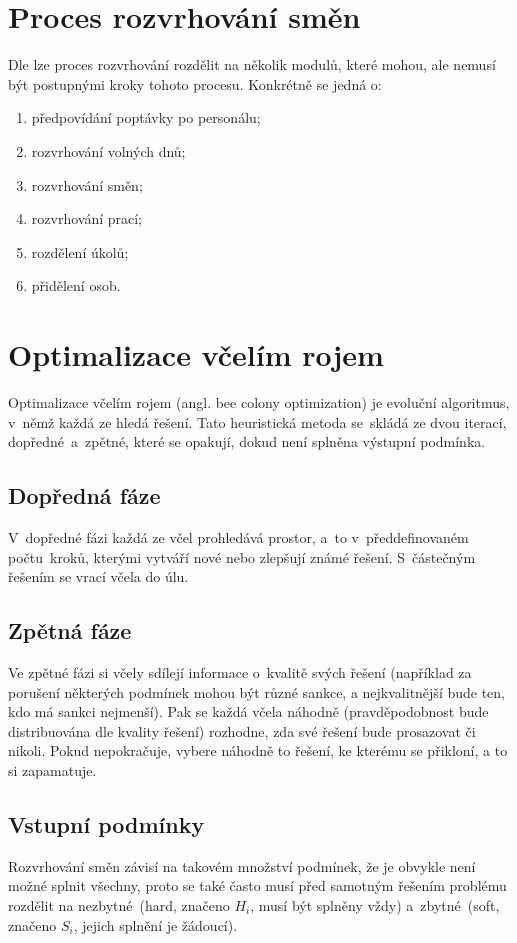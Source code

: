 \documentclass[twoside]{ctuthesis}
\begin{document}
\section{Proces rozvrhování směn}
Dle \cite{ernst2004staff} lze proces rozvrhování rozdělit na několik modulů, které mohou, ale nemusí být postupnými kroky tohoto procesu. Konkrétně se jedná o:
\begin{enumerate}
	\item předpovídání poptávky po personálu;
	\item rozvrhování volných dnů;
	\item rozvrhování směn;
	\item rozvrhování prací;
	\item rozdělení úkolů;
	\item přidělení osob.
\end{enumerate}

\section{Optimalizace včelím rojem}
Optimalizace včelím rojem (angl. bee colony optimization) je evoluční algoritmus, v~němž každá ze  hledá řešení. Tato heuristická metoda se~skládá ze dvou iterací, dopředné~a~zpětné, které se opakují, dokud není splněna výstupní podmínka. \cite{teodorovic2009bee}

\subsection{Dopředná fáze}
V~dopředné fázi každá ze včel prohledává prostor, a~to v~předdefinovaném počtu~kroků, kterými vytváří nové nebo zlepšují známé řešení. S~částečným řešením se vrací včela do úlu. \cite{teodorovic2009bee}

\subsection{Zpětná fáze}
Ve zpětné fázi si včely sdílejí informace o~kvalitě svých řešení (například za porušení některých podmínek mohou být různé sankce, a nejkvalitnější bude ten, kdo má sankci nejmenší). Pak se každá včela náhodně (pravděpodobnost bude distribuována dle kvality řešení) rozhodne, zda své řešení bude prosazovat či nikoli. Pokud nepokračuje, vybere náhodně to řešení, ke kterému se přikloní, a to si zapamatuje. \cite{teodorovic2009bee}

\subsection{Vstupní podmínky}
Rozvrhování směn závisí na takovém množství podmínek, že je obvykle není možné splnit všechny, proto se také často musí před samotným řešením problému rozdělit na nezbytné~(hard, značeno $H_i$, musí být splněny vždy) a~zbytné~(soft, značeno $S_i$, jejich splnění je žádoucí). \cite{todorovic2012bee}
\end{document}

